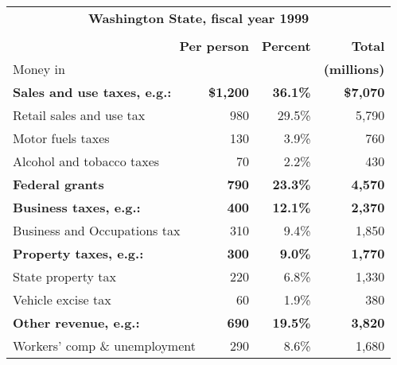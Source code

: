 \begin{table}[p]
\begin{center}
\begin{tabular}{lrrr}
\multicolumn{4}{c}{\bf Washington State, fiscal year 1999} \\ %
& & & \\ %
\multicolumn{2}{r}{\bf Per person} & \bf Percent & \bf Total \\ %
\sc Money in & & & \multicolumn{1}{c}{\small \bf (millions)} \\ %
\hspace{.1cm} \bf\small Sales and use taxes\rm, e.g.: & \bf\small \$1,200 & \bf\small 36.1\% & \bf\small \$7,070 \\ %
\hspace{.4cm} Retail sales and use tax & 980 & 29.5\% & 5,790 \\
\hspace{.4cm} Motor fuels taxes & 130 & 3.9\% & 760 \\
\hspace{.4cm} Alcohol and tobacco taxes & 70 & 2.2\% & 430 \\
\hspace{.1cm} \bf\small Federal grants & \bf\small 790 & \bf\small 23.3\% & \bf\small 4,570 \\
\hspace{.1cm} \bf\small Business taxes\rm, e.g.: & \bf\small 400 & \bf\small 12.1\% & \bf\small 2,370 \\
\hspace{.4cm} Business and Occupations tax & 310 & 9.4\% & 1,850 \\
\hspace{.1cm} \bf\small Property taxes\rm, e.g.: & \bf\small 300 & \bf\small 9.0\% & \bf\small 1,770 \\
\hspace{.4cm} State property tax & 220 & 6.8\% & 1,330 \\
\hspace{.4cm} Vehicle excise tax & 60 & 1.9\% & 380 \\
\hspace{.1cm} \bf\small Other revenue\rm, e.g.: & \bf\small 690 & \bf\small 19.5\% & \bf\small 3,820 \\
\hspace{.4cm} Workers' comp \& unemployment & 290 & 8.6\% & 1,680 \\ %

\end{tabular}
\end{center}
\end{table}
